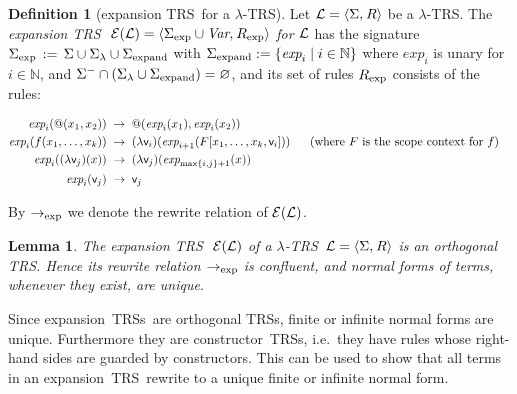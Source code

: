 \documentclass[
submission
]{dmtcs-episciences-tampered}
\makeatletter
\newcommand{\fap}[2]{#1({#2})}
\newcommand{\bfap}[3]{{#1}({#2},\hspace*{0.05pt}{#3})}
\newcommand{\indap}[2]{#1 _{#2}}
\newcommand{\supap}[2]{#1 ^{#2}}
\newcommand{\nb}{\nobreakdash}
\newcommand{\nf}{\normalfont}
\newcommand{\sdefdby}{{:=}}
\newcommand{\defdby}{\mathrel{\sdefdby}}
\newcommand{\tuple}[1]{\langle #1 \rangle}
\newcommand{\tuplespace}{\hspace*{0.5pt}}
\newcommand{\pair}[2]{\tuple{#1, \tuplespace #2}}
\newcommand{\descsetexpmid}{\mathrel{\vert}}
\newcommand{\descsetexp}[2]{\left\{{#1}\descsetexpmid{#2}\right\}}
\newcommand{\setexp}[1]{\left\{{#1}\right\}}
\renewcommand{\emptyset}{\varnothing}
\newcommand{\nat}{\mathbb{N}}
\newcommand{\avar}{x}
\newcommand{\avari}{\indap{\avar}}
\newcommand{\asig}{\Sigma}
\newcommand{\asigmin}{\supap{\asig}{-}}
\newcommand{\asiglambda}{\indap{\asig}{\lambda}}
\newcommand{\asigexpand}{\indap{\asig}{\scriptexpand}}
\newcommand{\asigexp}{\indap{\asig}{\scriptexp}}
\newcommand{\arules}{R}
\newcommand{\rulesexp}{\indap{\arules}{\scriptexp}}
\newcommand{\alTRS}{{\cal L}}
\newcommand{\TRS}{TRS}
\newcommand{\TRSs}{TRSs}
\newcommand{\vars}{\textit{Var}}
\newcommand{\sfolapp}{@}
\newcommand{\sfolabs}[1]{(\lambda{#1})}
\newcommand{\folapp}{\bfap{\sfolapp}}
\newcommand{\folabs}[1]{\fap{\sfolabs{#1}}}
\newcommand{\afovar}{\mathsf{v}}
\newcommand{\afovari}[1]{\indap{\afovar}{\hspace*{-0.25pt}#1}}
\newcommand{\afoscopesym}{f}
\newcommand{\afoscope}{\fap{\afoscopesym}}
\newcommand{\cxtap}[2]{{#1}[#2]}
\newcommand{\afoscopecxt}{F}
\newcommand{\afoscopecxtap}{\cxtap{\afoscopecxt}}
\newcommand{\sexpandTRS}{{\cal E}}
\newcommand{\expandTRSwrt}{\fap{\sexpandTRS}}
\newcommand{\sred}{\to}
\newcommand{\red}{\mathrel{\sred}}
\newcommand{\sredi}{\indap{\sred}}
\newcommand{\scriptexpand}{\text{\nf expand}}
\newcommand{\scriptexp}{\text{\nf exp}}
\newcommand{\sexpand}{\textit{exp}}
\newcommand{\sexpandi}{\indap{\sexpand}}
\newcommand{\expandi}[1]{\fap{\sexpandi{#1}}}
\newcommand{\sexpred}{\sredi{\scriptexp}}
\newcommand{\lTRS}{$\lambda$\hspace*{-0.5pt}\nb-\hspace*{-0.5pt}\TRS}
\theoremstyle{plain}
\newtheorem{lemma}[theorem]{Lemma}
\theoremstyle{definition}
\newtheorem{definition}[theorem]{Definition}
\makeatother
\begin{document}
\begin{definition}[expansion \TRS\ for a \lTRS]\label{def:expandTRS}
  Let $\alTRS = \pair{\asig}{\arules}$ be a \lTRS. 
  The \emph{expansion \TRS~$\,\expandTRSwrt{\alTRS} = \pair{\asigexp\cup\vars}{\rulesexp}$ for $\alTRS$}
  has the signature $\asigexp \,\defdby\, \asig \cup \asiglambda \cup \asigexpand$
  with $\asigexpand \defdby \descsetexp{ \sexpandi{i} }{ i\in\nat }$
  where $\sexpandi{i}$ is unary for $i\in\nat$, and $\asigmin \cap (\asiglambda \cup \asigexpand) = \emptyset$,
  and its set of rules $\rulesexp$ consists of the rules:
  \begin{center}
  $  
  \begin{aligned}
    \expandi{i}{\folapp{\avari{1}}{\avari{2}}}
      & \;\red\;
    \folapp{\expandi{i}{\avari{1}}}{\expandi{i}{\avari{2}}}  
    \\
    \expandi{i}{\afoscope{\avari{1},\ldots,\avari{k}}}
      & \;\red\;
    \folabs{\afovari{i}}{\expandi{i+1}{\afoscopecxtap{\avari{1},\ldots,\avari{k},\afovari{i}}}}
    & & \hspace*{1.5ex}\text{(where $\afoscopecxt$ is the scope context for $\afoscopesym$)}
    \\
    \expandi{i}{\folabs{\afovari{j}}{\avar}}
      & \;\red\;
    \folabs{\afovari{j}}{\expandi{\max\setexp{i,j}+1}{\avar}} 
    \\
    \expandi{i}{\afovari{j}} 
      & \;\red\;
    \afovari{j}
  \end{aligned}
  $
  \end{center}
  By $\sexpred$ we denote the rewrite relation of $\expandTRSwrt{\alTRS}$.
\end{definition}


\begin{lemma}\label{lem:expTRS:orthogonal:UN}
  The expansion \TRS~$\,\expandTRSwrt{\alTRS}$ 
  of a \lTRS~$\alTRS = \pair{\asig}{\arules}$  
  is an orthogonal TRS.
  Hence its rewrite relation $\sexpred$ is confluent,
  and normal forms of terms, whenever they exist, are unique.
\end{lemma}



Since expansion~\TRSs\ are orthogonal \TRSs, finite or infinite normal forms are unique.
Furthermore they are constructor~\TRSs, i.e.\ they have rules whose right-hand sides are guarded by constructors.
This can be used to show that all terms in an expansion~\TRS\ rewrite to a unique finite or infinite normal form.  
\end{document}

